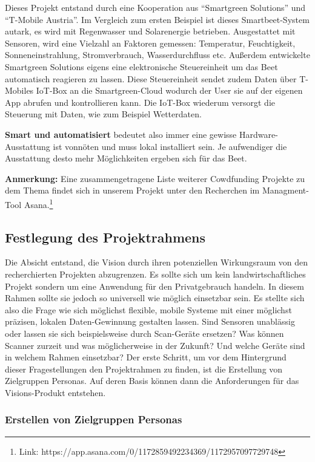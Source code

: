 Dieses Projekt entstand durch eine Kooperation aus ``Smartgreen
Solutions'' und ``T-Mobile Austria''. Im Vergleich zum ersten Beispiel
ist dieses Smartbeet-System autark, es wird mit Regenwasser und
Solarenergie betrieben. Ausgestattet mit Sensoren, wird eine Vielzahl an
Faktoren gemessen: Temperatur, Feuchtigkeit, Sonneneinstrahlung,
Stromverbrauch, Wasserdurchfluss etc. Außerdem entwickelte Smartgreen
Solutions eigens eine elektronische Steuereinheit um das Beet
automatisch reagieren zu lassen. Diese Steuereinheit sendet zudem Daten
über T-Mobiles IoT-Box an die Smartgreen-Cloud wodurch der User sie auf
der eigenen App abrufen und kontrollieren kann. Die IoT-Box wiederum
versorgt die Steuerung mit Daten, wie zum Beispiel Wetterdaten.

\textbf{Smart und automatisiert} bedeutet also immer eine gewisse
Hardware-Ausstattung ist vonnöten und muss lokal installiert sein. Je
aufwendiger die Ausstattung desto mehr Möglichkeiten ergeben sich für
das Beet.

\textbf{Anmerkung:} Eine zusammengetragene Liste weiterer Cowdfunding
Projekte zu dem Thema findet sich in unserem Projekt unter den
Recherchen im Managment-Tool Asana.\footnote{Link:
  https://app.asana.com/0/1172859492234369/1172957097729748}

\hypertarget{festlegung-des-projektrahmens}{%
\subsection{Festlegung des
Projektrahmens}\label{festlegung-des-projektrahmens}}

Die Absicht entstand, die Vision durch ihren potenziellen Wirkungsraum
von den recherchierten Projekten abzugrenzen. Es sollte sich um kein
landwirtschaftliches Projekt sondern um eine Anwendung für den
Privatgebrauch handeln. In diesem Rahmen sollte sie jedoch so universell
wie möglich einsetzbar sein. Es stellte sich also die Frage wie sich
möglichst flexible, mobile Systeme mit einer möglichst präzisen, lokalen
Daten-Gewinnung gestalten lassen. Sind Sensoren unablässig oder lassen
sie sich beispielsweise durch Scan-Geräte ersetzen? Was können Scanner
zurzeit und was möglicherweise in der Zukunft? Und welche Geräte sind in
welchem Rahmen einsetzbar? Der erste Schritt, um vor dem Hintergrund
dieser Fragestellungen den Projektrahmen zu finden, ist die Erstellung
von Zielgruppen Personas. Auf deren Basis können dann die Anforderungen
für das Visions-Produkt entstehen.

\hypertarget{erstellen-von-zielgruppen-personas}{%
\subsubsection{Erstellen von Zielgruppen
Personas}\label{erstellen-von-zielgruppen-personas}}

